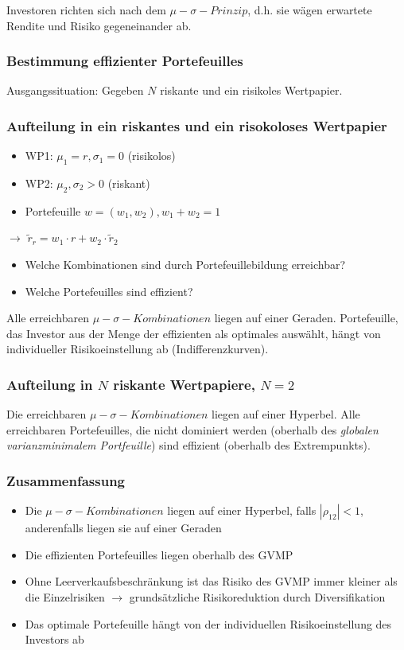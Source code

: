 Investoren richten sich nach dem \(\mu-\sigma-Prinzip\), d.h. sie wägen erwartete Rendite und Risiko gegeneinander ab.

\subsubsection{Bestimmung effizienter Portefeuilles}

Ausgangssituation: Gegeben \(N\) riskante und ein risikoles Wertpapier.

\subsubsection{Aufteilung in ein riskantes und ein risokoloses Wertpapier}
\begin{itemize}
	\item WP1: \(\mu_1 = r, \sigma_1 = 0\) (risikolos)
	\item WP2: \(\mu_2, \sigma_2 > 0\) (riskant)
	\item Portefeuille \(w = (w_1, w_2), w_1 + w_2 = 1\)
\end{itemize}

$\rightarrow$ \(\tilde{r}_r = w_1 \cdot r + w_2 \cdot \tilde{r}_2\)

\begin{itemize}
	\item Welche Kombinationen sind durch Portefeuillebildung erreichbar?
	\item Welche Portefeuilles sind effizient?
\end{itemize}
Alle erreichbaren \(\mu-\sigma-Kombinationen\) liegen auf einer Geraden.
Portefeuille, das Investor aus der Menge der effizienten als optimales auswählt, hängt von individueller Risikoeinstellung ab (Indifferenzkurven).

\subsubsection{Aufteilung in \(N\) riskante Wertpapiere, \(N = 2\)}
Die erreichbaren \(\mu-\sigma-Kombinationen\) liegen auf einer Hyperbel.
Alle erreichbaren Portefeuilles, die nicht dominiert werden (oberhalb des \textit{globalen varianzminimalem Portfeuille}) sind effizient (oberhalb des Extrempunkts).

\subsubsection{Zusammenfassung}
\begin{itemize}
	\item Die \(\mu-\sigma-Kombinationen\) liegen auf einer Hyperbel, falls \(|\rho_{12}| < 1\), anderenfalls liegen sie auf einer Geraden
	\item Die effizienten Portefeuilles liegen oberhalb des GVMP
	\item Ohne Leerverkaufsbeschränkung ist das Risiko des GVMP immer kleiner als die Einzelrisiken $\rightarrow$ grundsätzliche Risikoreduktion durch Diversifikation
	\item Das optimale Portefeuille hängt von der individuellen Risikoeinstellung des Investors ab
\end{itemize}

